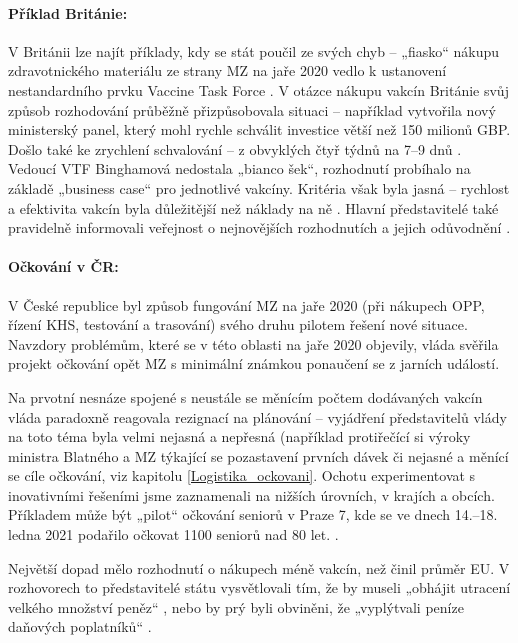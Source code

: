 \paragraph{Příklad Británie:} V Británii lze najít příklady, kdy se stát poučil ze svých chyb -- „fiasko“ nákupu zdravotnického materiálu ze strany MZ na jaře 2020 vedlo k ustanovení nestandardního prvku Vaccine Task Force \cite{balls_secrets_2021}. V otázce nákupu vakcín Británie svůj způsob rozhodování průběžně přizpůsobovala situaci -- například vytvořila nový ministerský panel, který mohl rychle schválit investice větší než 150 milionů GBP. Došlo také ke zrychlení schvalování -- z obvyklých čtyř týdnů na 7--9 dnů \cite{national_audit_office_investigation_2020}. Vedoucí VTF Binghamová nedostala „bianco šek“, rozhodnutí probíhalo na základě „business case“ pro jednotlivé vakcíny. Kritéria však byla jasná -- rychlost a efektivita vakcín byla důležitější než náklady na ně \cite{bolzen_kate_2021}. Hlavní představitelé také pravidelně informovali veřejnost o nejnovějších rozhodnutích a jejich odůvodnění \cite{davis_uk_2020}.

\paragraph{Očkování v ČR:} V České republice byl způsob fungování MZ na jaře 2020 (při nákupech OPP, řízení KHS, testování a trasování) svého druhu pilotem řešení nové situace. Navzdory problémům, které se v této oblasti na jaře 2020 objevily, vláda svěřila projekt očkování opět MZ s minimální známkou ponaučení se z jarních událostí.

Na prvotní nesnáze spojené s neustále se měnícím počtem dodávaných vakcín vláda paradoxně reagovala rezignací na plánování -- vyjádření představitelů vlády na toto téma byla velmi nejasná a nepřesná (například protiřečící si výroky ministra Blatného a MZ týkající se pozastavení prvních dávek či nejasné a měnící se cíle očkování, viz kapitolu \ref{Logistika_ockovani}. Ochotu experimentovat s inovativními řešeními jsme zaznamenali na nižších úrovních, v krajích a obcích. Příkladem může být „pilot“ očkování seniorů v Praze 7, kde se ve dnech 14.--18. ledna 2021 podařilo očkovat 1100 seniorů nad 80 let. \cite{bisop_osloveni_2021}.

Největší dopad mělo rozhodnutí o nákupech méně vakcín, než činil průměr EU. V rozhovorech to představitelé státu vysvětlovali tím, že by museli „obhájit utracení velkého množství peněz“ \cite{pokorna_proc_2021}, nebo by prý byli obviněni, že „vyplýtvali peníze daňových poplatníků“ \cite{hronova_kdybychom_2021}.

